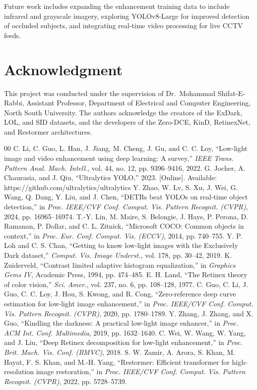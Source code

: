 \documentclass[conference]{IEEEtran}
\begin{document}
Future work includes expanding the enhancement training data to include infrared and grayscale imagery, exploring YOLOv8-Large for improved detection of occluded subjects, and integrating real-time video processing for live CCTV feeds.

\section*{Acknowledgment}

This project was conducted under the supervision of Dr.~Mohammad Shifat-E-Rabbi, Assistant Professor, Department of Electrical and Computer Engineering, North South University. The authors acknowledge the creators of the ExDark, LOL, and SID datasets, and the developers of the Zero-DCE, KinD, RetinexNet, and Restormer architectures.

\begin{thebibliography}{00}
 C. Li, C. Guo, L. Han, J. Jiang, M. Cheng, J. Gu, and C. C. Loy, ``Low-light image and video enhancement using deep learning: A survey,'' \textit{IEEE Trans. Pattern Anal. Mach. Intell.}, vol. 44, no. 12, pp. 9396--9416, 2022.
 G. Jocher, A. Chaurasia, and J. Qiu, ``Ultralytics YOLO,'' 2023. [Online]. Available: https://github.com/ultralytics/ultralytics
 Y. Zhao, W. Lv, S. Xu, J. Wei, G. Wang, Q. Dang, Y. Liu, and J. Chen, ``DETRs beat YOLOs on real-time object detection,'' in \textit{Proc. IEEE/CVF Conf. Comput. Vis. Pattern Recognit. (CVPR)}, 2024, pp. 16965--16974.
 T.-Y. Lin, M. Maire, S. Belongie, J. Hays, P. Perona, D. Ramanan, P. Dollar, and C. L. Zitnick, ``Microsoft COCO: Common objects in context,'' in \textit{Proc. Eur. Conf. Comput. Vis. (ECCV)}, 2014, pp. 740--755.
 Y. P. Loh and C. S. Chan, ``Getting to know low-light images with the Exclusively Dark dataset,'' \textit{Comput. Vis. Image Underst.}, vol. 178, pp. 30--42, 2019.
 K. Zuiderveld, ``Contrast limited adaptive histogram equalization,'' in \textit{Graphics Gems IV}, Academic Press, 1994, pp. 474--485.
 E. H. Land, ``The Retinex theory of color vision,'' \textit{Sci. Amer.}, vol. 237, no. 6, pp. 108--128, 1977.
 C. Guo, C. Li, J. Guo, C. C. Loy, J. Hou, S. Kwong, and R. Cong, ``Zero-reference deep curve estimation for low-light image enhancement,'' in \textit{Proc. IEEE/CVF Conf. Comput. Vis. Pattern Recognit. (CVPR)}, 2020, pp. 1780--1789.
 Y. Zhang, J. Zhang, and X. Guo, ``Kindling the darkness: A practical low-light image enhancer,'' in \textit{Proc. ACM Int. Conf. Multimedia}, 2019, pp. 1632--1640.
 C. Wei, W. Wang, W. Yang, and J. Liu, ``Deep Retinex decomposition for low-light enhancement,'' in \textit{Proc. Brit. Mach. Vis. Conf. (BMVC)}, 2018.
 S. W. Zamir, A. Arora, S. Khan, M. Hayat, F. S. Khan, and M.-H. Yang, ``Restormer: Efficient transformer for high-resolution image restoration,'' in \textit{Proc. IEEE/CVF Conf. Comput. Vis. Pattern Recognit. (CVPR)}, 2022, pp. 5728--5739.
\end{thebibliography}
\end{document}
